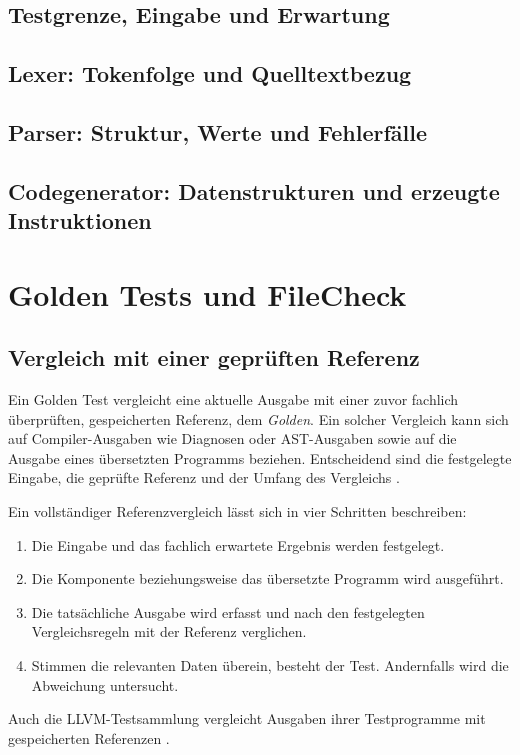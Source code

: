 \documentclass[11pt,a4paper]{article}
\begin{document}
\subsection{Testgrenze, Eingabe und Erwartung}

\subsection{Lexer: Tokenfolge und Quelltextbezug}

\subsection{Parser: Struktur, Werte und Fehlerfälle}

\subsection{Codegenerator: Datenstrukturen und erzeugte Instruktionen}


\section{Golden Tests und FileCheck}
\subsection{Vergleich mit einer geprüften Referenz}
Ein Golden Test vergleicht eine aktuelle Ausgabe mit einer zuvor fachlich überprüften, gespeicherten Referenz, dem \emph{Golden}. Ein solcher Vergleich kann sich auf Compiler-Ausgaben wie Diagnosen oder AST-Ausgaben sowie auf die Ausgabe eines übersetzten Programms beziehen. Entscheidend sind die festgelegte Eingabe, die geprüfte Referenz und der Umfang des Vergleichs \cite{clang,suiteguide}.

Ein vollständiger Referenzvergleich lässt sich in vier Schritten beschreiben: 
\begin{enumerate}
    \item Die Eingabe und das fachlich erwartete Ergebnis werden festgelegt.
    \item Die Komponente beziehungsweise das übersetzte Programm
          wird ausgeführt.
    \item Die tatsächliche Ausgabe wird erfasst und nach den festgelegten
          Vergleichsregeln mit der Referenz verglichen.
    \item Stimmen die relevanten Daten überein, besteht der Test.
          Andernfalls wird die Abweichung untersucht.
\end{enumerate}
Auch die LLVM-Testsammlung vergleicht Ausgaben ihrer Testprogramme mit gespeicherten Referenzen \cite{suiteguide}.
\end{document}
